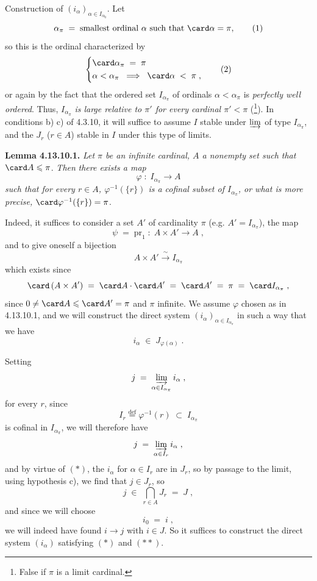 Construction of $(i_\alpha)_{\alpha\in I_{\alpha_0}}$. Let %
\[ \alpha_\pi \; = \; \text{smallest ordinal } \alpha \text{ such that } \card\alpha=\pi, \tag*{(1)} \]
so this is the ordinal characterized by
\[ \left\{
\begin{aligned}
&\card\alpha_\pi \; = \; \pi \\
&\alpha<\alpha_\pi \;\; \Longrightarrow \;\; \card\alpha \; < \; \pi \; ,
\end{aligned}
\right. \tag*{(2)} \]
or again by the fact that the ordered set $I_{\alpha_\pi}$ of ordinals $\alpha<\alpha_\pi$ is \textit{perfectly well ordered}. Thus, $I_{\alpha_\pi}$ \textit{is large relative to $\pi'$ for every cardinal $\pi'<\pi$} (\footnote[130]{False if $\pi$ is a limit cardinal.}). In conditions b) c) of 4.3.10, it will suffice to assume $I$ stable under $\varinjlim$ of type $I_{\alpha_\pi}$, and the $J_r$ ($r\in A$) stable in $I$ under this type of limits. %

\textbf{Lemma 4.13.10.1.} \textit{Let $\pi$ be an infinite cardinal, $A$ a nonempty set such that} $\card A\leqslant\pi$. \textit{Then}
\textit{there exists a map}
\[ \varphi \; : \; I_{\alpha_\pi} \longrightarrow A \]
\textit{such that for every $r\in A$, $\varphi^{-1}(\{r\})$ is a cofinal subset of $I_{\alpha_\pi}$, or what is more precise,} $\card\varphi^{-1}(\{r\})=\pi$. %

Indeed, it suffices to consider a set $A'$ of cardinality $\pi$ (e.g. $A'=I_{\alpha_\pi}$), the map
\[ \psi \; = \; \mathrm{pr}_1 \; : \; A\times A'\longrightarrow A \; , \]
and to give oneself a bijection
\[ A\times A' \xrightarrow{\ \sim\ } I_{\alpha_\pi} \]
which exists since
\[ \card\,(A\times A') \; = \; \card A\cdot\card A' \; = \; \card A' \; = \; \pi \; = \; \card I_{\alpha_\pi} \; , \]
since $0\neq\card A\leqslant\card A'=\pi$ and $\pi$ infinite. We assume $\varphi$ chosen as in 4.13.10.1, and we will construct the direct system $(i_\alpha)_{\alpha\in I_{\alpha_\pi}}$ in such a way that we have
\[ i_\alpha \; \in \; J_{\varphi(\alpha)} \; . \]

Setting
\[ j \; = \; \varinjlim_{\alpha\in I_{\alpha_\pi}} i_\alpha \; , \]
for every $r$, since
\[ I_r \overset{\text{def}}{=} \varphi^{-1}(r) \; \subset \; I_{\alpha_\pi} \]
is cofinal in $I_{\alpha_\pi}$, we will therefore have
\[ j \; = \; \varinjlim_{\alpha\in I_r} i_\alpha \; , \]
and by virtue of $(*)$, the $i_\alpha$ for $\alpha\in I_r$ are in $J_r$, so by passage to the limit, using hypothesis c), we find that $j\in J_r$, so
\[ j \; \in \; \bigcap_{r\in A} J_r \; = \; J \; , \]
and since we will choose
\[ i_0 \; = \; i \; , \tag*{$(**)$} \]
we will indeed have found $i\longrightarrow j$ with $i\in J$. So it suffices to construct the direct system $(i_\alpha)$ satisfying $(*)$ and $(**)$. %

